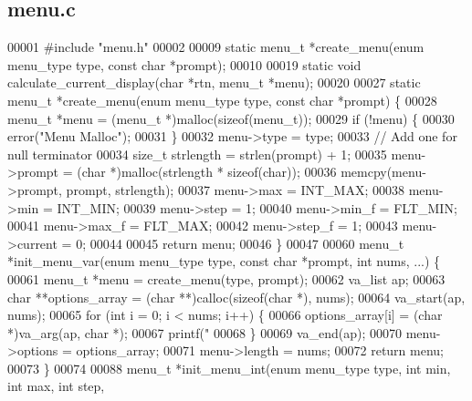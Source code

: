 \subsection{menu.\+c}
\label{a00128_source}

\begin{DoxyCode}
00001 \textcolor{preprocessor}{#include "menu.h"}
00002 
00009 \textcolor{keyword}{static} menu_t *create_menu(\textcolor{keyword}{enum} menu_type type, \textcolor{keyword}{const} \textcolor{keywordtype}{char} *prompt);
00010 
00019 \textcolor{keyword}{static} \textcolor{keywordtype}{void} calculate_current_display(\textcolor{keywordtype}{char} *rtn, menu_t *menu);
00020 
00027 \textcolor{keyword}{static} menu_t *create_menu(\textcolor{keyword}{enum} menu_type type, \textcolor{keyword}{const} \textcolor{keywordtype}{char} *prompt) \{
00028   menu_t *menu = (menu_t *)malloc(\textcolor{keyword}{sizeof}(menu_t));
00029   \textcolor{keywordflow}{if} (!menu) \{
00030     error(\textcolor{stringliteral}{"Menu Malloc"});
00031   \}
00032   menu->type = type;
00033   \textcolor{comment}{// Add one for null terminator}
00034   \textcolor{keywordtype}{size\_t} strlength = strlen(prompt) + 1;
00035   menu->prompt = (\textcolor{keywordtype}{char} *)malloc(strlength * \textcolor{keyword}{sizeof}(\textcolor{keywordtype}{char}));
00036   memcpy(menu->prompt, prompt, strlength);
00037   menu->max = INT\_MAX;
00038   menu->min = INT\_MIN;
00039   menu->step = 1;
00040   menu->min_f = FLT\_MIN;
00041   menu->max_f = FLT\_MAX;
00042   menu->step_f = 1;
00043   menu->current = 0;
00044 
00045   \textcolor{keywordflow}{return} menu;
00046 \}
00047 
00060 menu_t *init_menu_var(\textcolor{keyword}{enum} menu_type type, \textcolor{keyword}{const} \textcolor{keywordtype}{char} *prompt, \textcolor{keywordtype}{int} nums, ...) \{
00061   menu_t *menu = create_menu(type, prompt);
00062   va\_list ap;
00063   \textcolor{keywordtype}{char} **options\_array = (\textcolor{keywordtype}{char} **)calloc(\textcolor{keyword}{sizeof}(\textcolor{keywordtype}{char} *), nums);
00064   va\_start(ap, nums);
00065   \textcolor{keywordflow}{for} (\textcolor{keywordtype}{int} i = 0; i < nums; i++) \{
00066     options\_array[i] = (\textcolor{keywordtype}{char} *)va\_arg(ap, \textcolor{keywordtype}{char} *);
00067     printf(\textcolor{stringliteral}{"%
00068   \}
00069   va\_end(ap);
00070   menu->options = options\_array;
00071   menu->length = nums;
00072   \textcolor{keywordflow}{return} menu;
00073 \}
00074 
00088 menu_t *init_menu_int(\textcolor{keyword}{enum} menu_type type, \textcolor{keywordtype}{int} min, \textcolor{keywordtype}{int} max, \textcolor{keywordtype}{int} step,
}
\end{DoxyCode}
